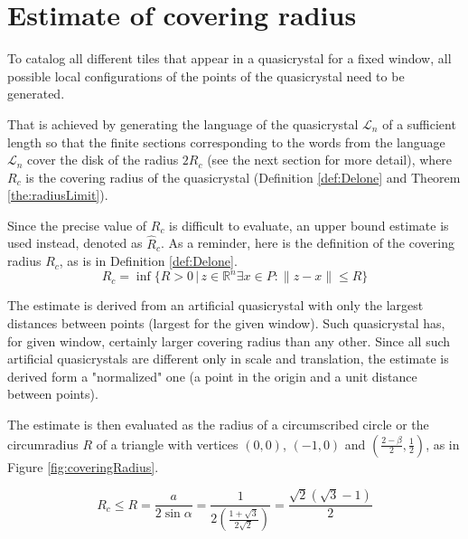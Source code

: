 \documentclass[text.tex]{subfiles}
\begin{document}
\section{Estimate of covering radius}
To catalog all different tiles that appear in a quasicrystal for a fixed window, all possible local configurations of the points of the quasicrystal need to be generated. 

That is achieved by generating the language of the quasicrystal $\mathcal{L}_n$ of a sufficient length so that the finite sections corresponding to the words from the language $\mathcal{L}_n$ cover the disk of the radius $2R_c$ (see the next section for more detail), where $R_c$ is the covering radius of the quasicrystal (Definition \ref{def:Delone} and Theorem \ref{the:radiusLimit}).

Since the precise value of $R_c$ is difficult to evaluate, an upper bound estimate is used instead, denoted as $\hat{R}_c$. As a reminder, here is the definition of the covering radius $R_c$, as is in Definition \ref{def:Delone}.
$$R_c = \inf\{R>0\,|\, z\in\mathbb{R}^n \exists x\in P: \|z-x\|\leq R\}$$

The estimate is derived from an artificial quasicrystal with only the largest distances between points (largest for the given window). Such quasicrystal has, for given window, certainly larger covering radius than any other. Since all such artificial quasicrystals are different only in scale and translation, the estimate is derived form a "normalized" one (a point in the origin and a unit distance between points).

The estimate is then evaluated as the radius of a circumscribed circle or the circumradius $R$ of a triangle with vertices $(0,0)$, $(-1,0)$ and $\left(\frac{2-\beta}{2},\frac{1}{2}\right)$, as in Figure \ref{fig:coveringRadius}. 

$$R_c \leq R = \frac{a}{2\sin{\alpha}} = \frac{1}{2\left(\frac{1+\sqrt{3}}{2\sqrt{2}}\right)} = \frac{\sqrt{2}(\sqrt{3}-1)}{2}$$
\end{document}
